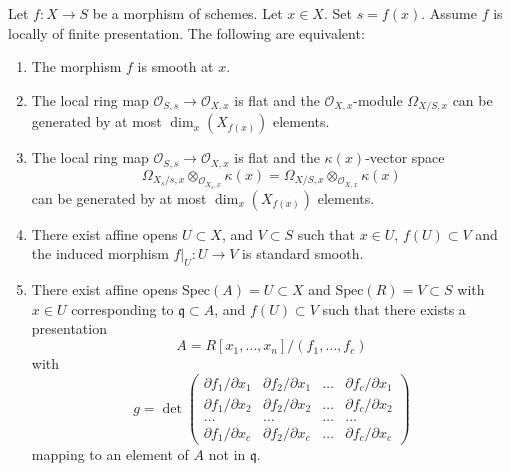 \begin{lemma}
\label{lemma-smooth-at-point}
Let $f : X \to S$ be a morphism of schemes.
Let $x \in X$.
Set $s = f(x)$.
Assume $f$ is locally of finite presentation.
The following are equivalent:
\begin{enumerate}
\item The morphism $f$ is smooth at $x$.
\item The local ring map $\mathcal{O}_{S, s} \to \mathcal{O}_{X, x}$
is flat and the $\mathcal{O}_{X, x}$-module $\Omega_{X/S, x}$
can be generated by at most $\dim_x(X_{f(x)})$ elements.
\item The local ring map $\mathcal{O}_{S, s} \to \mathcal{O}_{X, x}$
is flat and the $\kappa(x)$-vector space
$$
\Omega_{X_s/s, x} \otimes_{\mathcal{O}_{X_s, x}} \kappa(x) =
\Omega_{X/S, x} \otimes_{\mathcal{O}_{X, x}} \kappa(x)
$$
can be generated by at most $\dim_x(X_{f(x)})$ elements.
\item There exist affine opens $U \subset X$,
and $V \subset S$ such that $x \in U$, $f(U) \subset V$ and the
induced morphism $f|_U : U \to V$ is standard smooth.
\item There exist affine opens $\text{Spec}(A) = U \subset X$
and $\text{Spec}(R) = V \subset S$ with $x \in U$ corresponding
to $\mathfrak q \subset A$, and $f(U) \subset V$
such that there exists a presentation
$$
A = R[x_1, \ldots, x_n]/(f_1, \ldots, f_c)
$$
with
$$
g =
\det
\left(
\begin{matrix}
\partial f_1/\partial x_1 &
\partial f_2/\partial x_1 &
\ldots &
\partial f_c/\partial x_1 \\
\partial f_1/\partial x_2 &
\partial f_2/\partial x_2 &
\ldots &
\partial f_c/\partial x_2 \\
\ldots & \ldots & \ldots & \ldots \\
\partial f_1/\partial x_c &
\partial f_2/\partial x_c &
\ldots &
\partial f_c/\partial x_c
\end{matrix}
\right)
$$
mapping to an element of $A$ not in $\mathfrak q$.
\end{enumerate}
\end{lemma}

